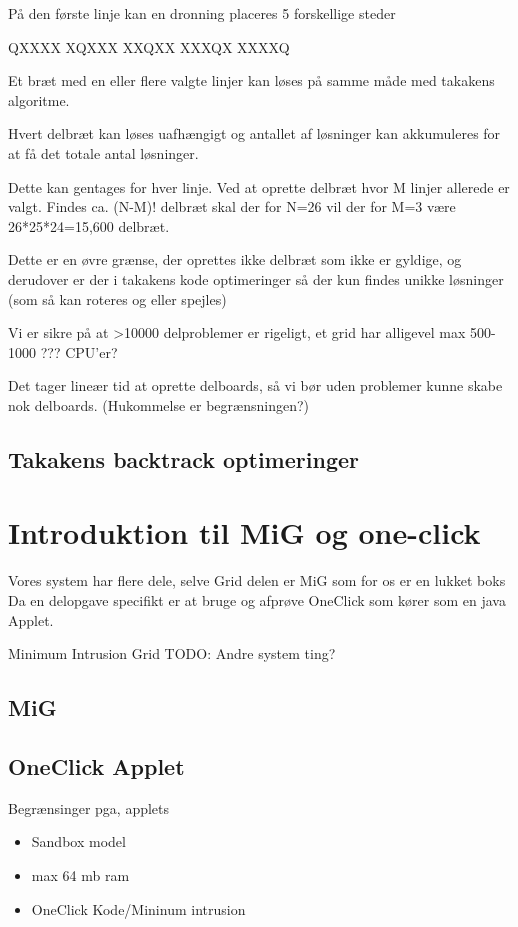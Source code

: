 \documentclass[a4,10pt]{article}
\begin{document}
På den første linje kan en dronning placeres 5 forskellige steder



QXXXX
XQXXX
XXQXX
XXXQX
XXXXQ


Et bræt med en eller flere valgte linjer kan løses på samme måde med takakens algoritme.

Hvert delbræt kan løses uafhængigt og antallet af løsninger kan akkumuleres for at få det totale antal løsninger.


Dette kan gentages for hver linje. Ved at oprette delbræt hvor M linjer allerede er valgt. Findes ca. (N-M)! delbræt skal der for N=26 vil der for M=3 være 26*25*24=15,600 delbræt.

Dette er en øvre grænse, der oprettes ikke delbræt som ikke er gyldige, og derudover er der i takakens kode optimeringer så der kun findes unikke løsninger (som så kan roteres og eller spejles)


Vi er sikre på at >10000 delproblemer er rigeligt, et grid har alligevel max 500-1000 ??? CPU'er?

Det tager lineær tid at oprette delboards, så vi bør uden problemer kunne skabe nok delboards. (Hukommelse er begrænsningen?)

\subsection{Takakens backtrack optimeringer}

\section{Introduktion til MiG og one-click}


Vores system har flere dele, selve Grid delen er MiG som for os er en lukket boks
Da en delopgave specifikt er at bruge og afprøve OneClick som kører som en java Applet.

Minimum Intrusion Grid
TODO: Andre system ting?
\subsection{MiG}\label{MiG}




\subsection{OneClick Applet}\label{Applet}
Begrænsinger pga, applets
\begin{itemize}
	\item Sandbox model
	\item max 64 mb ram
	\item OneClick Kode/Mininum intrusion
\end{itemize}
\end{document}
